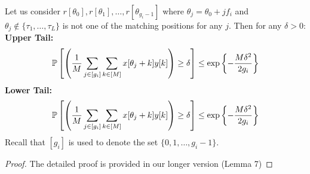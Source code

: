 \begin{lemma}
	\label{Lem:tailbounds}
Let us consider $r[\theta_0],r[\theta_1],\ldots ,r[\theta_{g_i-1}]$ where $\theta_j=\theta_0+jf_i$ and $\theta_j \notin \{\tau_1,\ldots, \tau_L\}$ is not one of the matching positions for any $j$. Then for any $\delta>0$:\\
{\bf Upper Tail:}
\begin{align*}
\mathbb{P}\left[ \left(\frac{1}{M}\sum\limits_{j\in[g_i]}\sum\limits_{k\in[M]}x[\theta_j+k]y[k]\right)\geq \delta\right]\leq \exp\left\lbrace-\frac{M\delta^2}{2g_i}\right\rbrace
\end{align*}
{\bf Lower Tail:}
\begin{align*}
\mathbb{P}\left[ \left(\frac{1}{M}\sum\limits_{j\in[g_i]}\sum\limits_{k\in[M]}x[\theta_j+k]y[k]\right)\geq \delta\right]\leq \exp\left\lbrace-\frac{M\delta^2}{2g_i}\right\rbrace\\
\end{align*}
Recall that $[g_i]$ is used to denote the set $\{0,1,\ldots,g_i-1\}$.
\end{lemma}
\begin{proof}
The detailed proof is provided in our longer version \cite{nagaraj2017pattern} (Lemma 7)
\end{proof}
%
